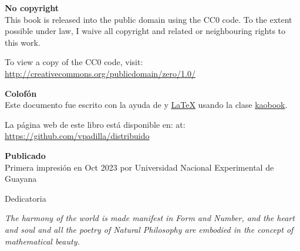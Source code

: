 

\makeatletter

\vspace{1cm}
 	\begin{center}
	 	  	\huge { \@titlehead }
 	 	   \end{center}  
 	    \makeatother
 
  	 
 \vspace{14cm}
 
	\small{	
	\textbf{No copyright}\\
	\cczero This book is released into the public domain using the CC0 code. To the extent possible under law, I waive all copyright and related or neighbouring rights to this work.
	
	To view a copy of the CC0 code, visit: \\\url{http://creativecommons.org/publicdomain/zero/1.0/}
	
 \vspace{1cm}
	
	\textbf{Colof\'on} \\
	Este documento fue escrito con la ayuda de
  \href{https://sourceforge.net/projects/koma-script/}{\KOMAScript} y \href{https://www.latex-project.org/}{\LaTeX} usando la clase \href{https://github.com/fmarotta/kaobook/}{kaobook}.
	
	La p\'agina web   de este libro est\'a disponible en: at:\\\url{https://github.com/vpadilla/distribuido}
	
	 \vspace{1cm}
	
	\textbf{Publicado} \\
	Primera impresi\'on en Oct 2023 por Universidad Nacional Experimental de Guayana 
 
}

\newpage
 

 \vspace*{8cm}

 \begin{Huge}
 	{Dedicatoria}
 \end{Huge}
 
 \vspace{1cm}
  
 \begin{Large}
 
 
	\textit{	 
	The harmony of the world is made manifest in Form and Number, and the heart and soul and all the poetry of Natural Philosophy are embodied in the concept of mathematical beauty.\\
	\hspace{4cm}{ -- D'Arcy Wentworth Thompson}
	}
	
\end{Large}
 